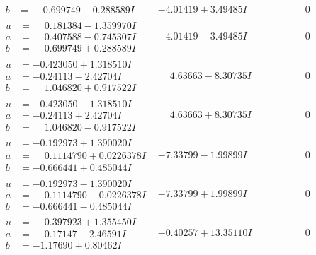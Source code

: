 \documentclass[1p]{elsarticle_modified}
\theoremstyle{definition}
\begin{document}
$$\begin{array}{c|c|c}
\begin{aligned}
b &= \phantom{-}0.699749 - 0.288589 I\end{aligned}
 & -4.01419 + 3.49485 I & \phantom{-0.000000 } 0 \\ \hline\begin{aligned}
u &= \phantom{-}0.181384 - 1.359970 I \\
a &= \phantom{-}0.407588 - 0.745307 I \\
b &= \phantom{-}0.699749 + 0.288589 I\end{aligned}
 & -4.01419 - 3.49485 I & \phantom{-0.000000 } 0 \\ \hline\begin{aligned}
u &= -0.423050 + 1.318510 I \\
a &= -0.24113 - 2.42704 I \\
b &= \phantom{-}1.046820 + 0.917522 I\end{aligned}
 & \phantom{-}4.63663 - 8.30735 I & \phantom{-0.000000 } 0 \\ \hline\begin{aligned}
u &= -0.423050 - 1.318510 I \\
a &= -0.24113 + 2.42704 I \\
b &= \phantom{-}1.046820 - 0.917522 I\end{aligned}
 & \phantom{-}4.63663 + 8.30735 I & \phantom{-0.000000 } 0 \\ \hline\begin{aligned}
u &= -0.192973 + 1.390020 I \\
a &= \phantom{-}0.1114790 + 0.0226378 I \\
b &= -0.666441 + 0.485044 I\end{aligned}
 & -7.33799 - 1.99899 I & \phantom{-0.000000 } 0 \\ \hline\begin{aligned}
u &= -0.192973 - 1.390020 I \\
a &= \phantom{-}0.1114790 - 0.0226378 I \\
b &= -0.666441 - 0.485044 I\end{aligned}
 & -7.33799 + 1.99899 I & \phantom{-0.000000 } 0 \\ \hline\begin{aligned}
u &= \phantom{-}0.397923 + 1.355450 I \\
a &= \phantom{-}0.17147 - 2.46591 I \\
b &= -1.17690 + 0.80462 I\end{aligned}
 & -0.40257 + 13.35110 I & \phantom{-0.000000 } 0 \\ \hline\begin{aligned}

\end{aligned}
\end{array}$$
\end{document}
